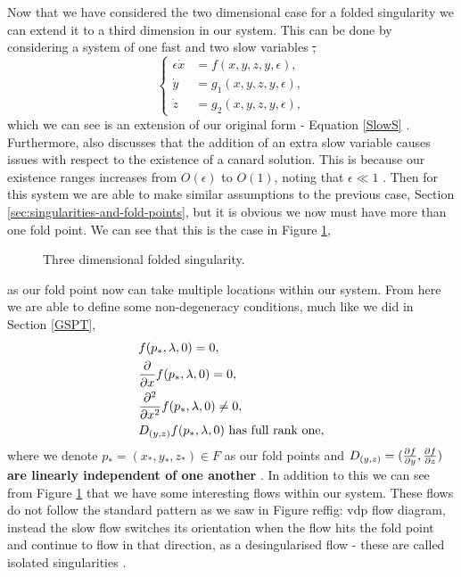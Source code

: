 
Now that we have considered the two dimensional case for a folded singularity we can extend it to a third dimension in our system. This can be done by considering a system of one fast and two slow variables \st, 
\begin{equation}
\begin{cases}
\epsilon \dot{x}&=f(x,y,z,y,\epsilon),\\
\dot{y}&=g_1(x,y,z,y,\epsilon),\\
\dot{z}&=g_2(x,y,z,y,\epsilon),
\end{cases}\label{eq: fs singularity system}
\end{equation}
which we can see is an extension of our original form - Equation \ref{SlowS} \citep{MMO}. Furthermore, \citet{MMO} also discusses that the addition of an extra slow variable causes issues with respect to the existence of a canard solution. This is because our existence ranges increases from $ O(\epsilon) $ to $ O(1) $, noting that $ \epsilon\ll 1 $ \citep{MMO}. Then for this system we are able to make similar assumptions to the previous case, Section \ref{sec:singularities-and-fold-points}, but it is obvious we now must have more than one fold point. We can see that this is the case in Figure \ref{fig: 3d folded singularity},
\begin{figure}[h!]\centering
	\caption{Three dimensional folded singularity.}
	\label{fig: 3d folded singularity}
\end{figure}
as our fold point now can take multiple locations within our system. From here we are able to define some non-degeneracy conditions, much like we did in Section \ref{GSPT},
\begin{equation}
\begin{aligned}
&f(p_*,\lambda,0)=0,\\
&\pd{}{x}f(p_*,\lambda,0)=0,\\
&\pd{^2}{x^2}f(p_*,\lambda,0)\neq 0,\\
&D_{(y,z)}f(p_*,\lambda,0) \ \text{has full rank one},
\end{aligned}
\label{eq: non-degeneracy 3d system}	
\end{equation}
where we denote $ p_*=(x_*,y_*,z_*)\in F $ as our fold points and\textbf{ $ D_{(y,z)}=(\pd{f}{y},\pd{f}{z}) $ are linearly independent of one another } \citep{MMO}. In addition to this we can see from Figure \ref{fig: 3d folded singularity} that we have some interesting flows within our system. These flows do not follow the standard pattern as we saw in Figure ref{fig: vdp flow diagram}, instead the slow flow switches its orientation when the flow hits the fold point and continue to flow in that direction, as a desingularised flow - these are called isolated singularities \citep{MMO}. %
